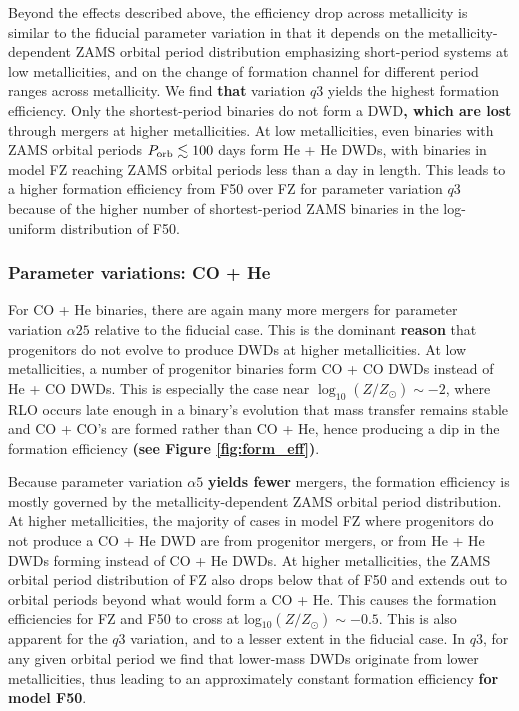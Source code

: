 \documentclass[twocolumn, linenumbers]{aastex631}
\begin{document}
Beyond the effects described above, the efficiency drop across metallicity is similar to the fiducial parameter variation in that it depends on the metallicity-dependent ZAMS orbital period distribution emphasizing short-period systems at low metallicities, and on the change of formation channel for different period ranges across metallicity. We find \textbf{that} variation $q3$ yields the highest formation efficiency. Only the shortest-period binaries do not form a DWD\textbf{, which are lost} through mergers at higher metallicities. At low metallicities, even binaries with ZAMS orbital periods $P_{\rm{orb}}\lesssim 100$ days form He + He DWDs, with binaries in model FZ reaching ZAMS orbital periods less than a day in length. This leads to a higher formation efficiency from F50 over FZ for parameter variation $q3$ because of the higher number of shortest-period ZAMS binaries in the log-uniform distribution of F50.

\subsubsection{\textbf{Parameter variations: CO + He}}\label{formeff_COHe_vars}
For CO + He binaries, there are again many more mergers for parameter variation $\alpha25$ relative to the fiducial case. This is the dominant \textbf{reason} that progenitors do not evolve to produce DWDs at higher metallicities. At low metallicities, a number of progenitor binaries form CO + CO DWDs instead of He + CO DWDs. This is especially the case near $\log_{10}(Z/Z_\odot)\sim -2$, where RLO occurs late enough in a binary's evolution that mass transfer remains stable and CO + CO's are formed rather than CO + He, hence producing a dip in the formation efficiency \textbf{(see Figure \ref{fig:form_eff})}.


Because parameter variation $\alpha5$ \textbf{yields fewer} mergers, the formation efficiency is mostly governed by the metallicity-dependent ZAMS orbital period distribution. At higher metallicities, the majority of cases in model FZ where progenitors do not produce a CO + He DWD are from progenitor mergers, or from He + He DWDs forming instead of CO + He DWDs. At higher metallicities, the ZAMS orbital period distribution of FZ also drops below that of F50 and extends out to orbital periods beyond what would form a CO + He. This causes the formation efficiencies for FZ and F50 to cross at log$_{10}(Z/Z_\odot)\sim-0.5$. This is also apparent for the $q3$ variation, and to a lesser extent in the fiducial case. In $q3$, for any given orbital period we find that lower-mass DWDs originate from lower metallicities, thus leading to an approximately constant formation efficiency \textbf{for model F50}.
\end{document}
